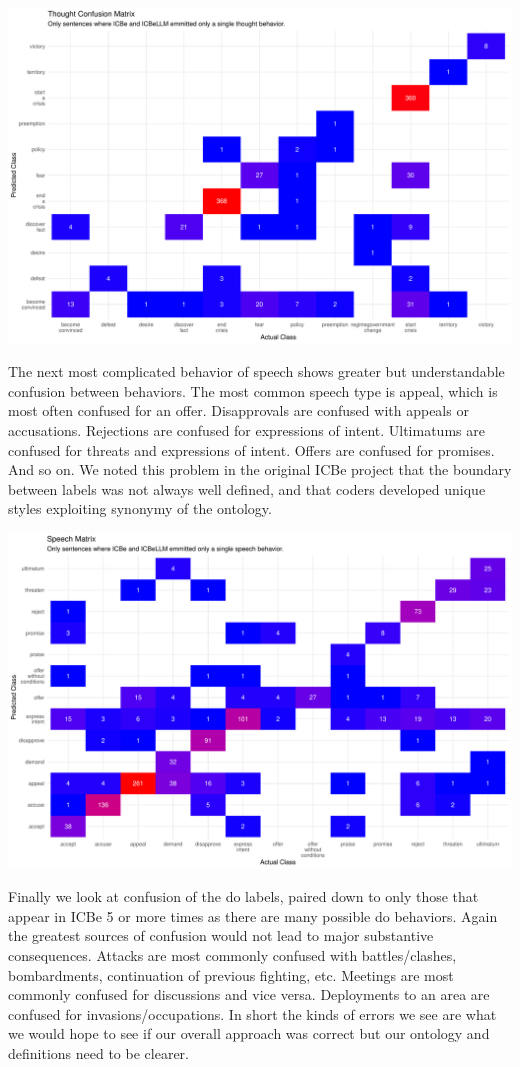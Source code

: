\documentclass[
]{article}
\begin{document}
\includegraphics{arxiv_Douglass_et_al_2024_ICBeLLM_files/figure-pdf/unnamed-chunk-9-1.pdf}

The next most complicated behavior of speech shows greater but
understandable confusion between behaviors. The most common speech type
is appeal, which is most often confused for an offer. Disapprovals are
confused with appeals or accusations. Rejections are confused for
expressions of intent. Ultimatums are confused for threats and
expressions of intent. Offers are confused for promises. And so on. We
noted this problem in the original ICBe project that the boundary
between labels was not always well defined, and that coders developed
unique styles exploiting synonymy of the ontology.

\includegraphics{arxiv_Douglass_et_al_2024_ICBeLLM_files/figure-pdf/unnamed-chunk-11-1.pdf}

Finally we look at confusion of the do labels, paired down to only those
that appear in ICBe 5 or more times as there are many possible do
behaviors. Again the greatest sources of confusion would not lead to
major substantive consequences. Attacks are most commonly confused with
battles/clashes, bombardments, continuation of previous fighting, etc.
Meetings are most commonly confused for discussions and vice versa.
Deployments to an area are confused for invasions/occupations. In short
the kinds of errors we see are what we would hope to see if our overall
approach was correct but our ontology and definitions need to be
clearer.
\end{document}
